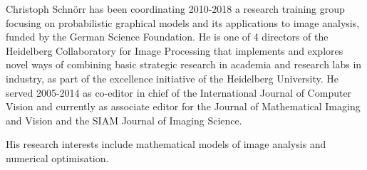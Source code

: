 Christoph Schn\"{o}rr has been coordinating 2010-2018 a research training group focusing on probabilistic graphical models and its applications to image analysis, funded by the German Science Foundation. He is one of 4 directors of the Heidelberg Collaboratory for Image Processing that implements and explores novel ways of combining basic strategic research in academia and research labs in industry, as part of the excellence initiative of the Heidelberg University. He served 2005-2014 as co-editor in chief of the International Journal of Computer Vision and currently as associate editor for the Journal of Mathematical Imaging and Vision and the SIAM Journal of Imaging Science.

His research interests include mathematical models of image analysis and numerical optimisation.

